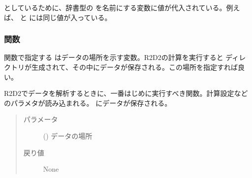 \documentclass[letterpaper,10pt,dvipdfmx,report]{sphinxmanual}
\begin{document}
としているために、辞書型の  を名前にする変数に値が代入されている。例えば、  と  には同じ値が入っている。


\subsubsection{関数}
\label{\detokenize{io:id5}}
関数で指定する  はデータの場所を示す変数。R2D2の計算を実行すると  ディレクトリが生成されて、その中にデータが保存される。この場所を指定すれば良い。

\begin{fulllineitems}
\label{\detokenize{io:R2D2.init}}
R2D2でデータを解析するときに、一番はじめに実行すべき関数。計算設定などのパラメタが読み込まれる。  にデータが保存される。
\begin{quote}\begin{description}
\item[{パラメータ}] \leavevmode
{} () \sphinxhyphen{}\sphinxhyphen{} データの場所

\item[{戻り値}] \leavevmode
None

\end{description}\end{quote}

\end{fulllineitems}

\end{document}
